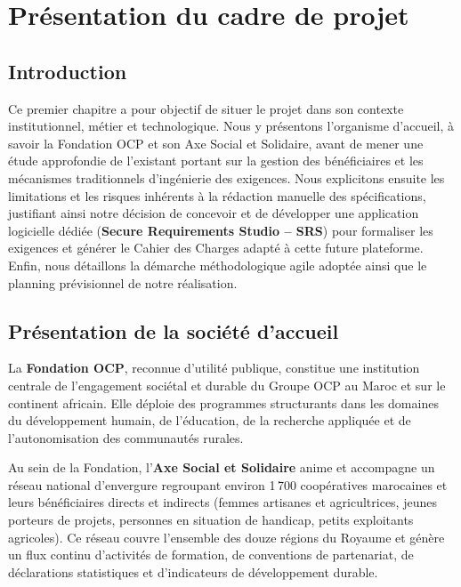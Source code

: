 \chapter{Présentation du cadre de projet}

\section{Introduction}

Ce premier chapitre a pour objectif de situer le projet dans son contexte institutionnel, métier et technologique. Nous y présentons l'organisme d'accueil, à savoir la Fondation OCP et son Axe Social et Solidaire, avant de mener une étude approfondie de l'existant portant sur la gestion des bénéficiaires et les mécanismes traditionnels d'ingénierie des exigences. Nous explicitons ensuite les limitations et les risques inhérents à la rédaction manuelle des spécifications, justifiant ainsi notre décision de concevoir et de développer une application logicielle dédiée (\textbf{Secure Requirements Studio -- SRS}) pour formaliser les exigences et générer le Cahier des Charges adapté à cette future plateforme. Enfin, nous détaillons la démarche méthodologique agile adoptée ainsi que le planning prévisionnel de notre réalisation.

\section{Présentation de la société d'accueil}

La \textbf{Fondation OCP}, reconnue d'utilité publique, constitue une institution centrale de l'engagement sociétal et durable du Groupe OCP au Maroc et sur le continent africain. Elle déploie des programmes structurants dans les domaines du développement humain, de l'éducation, de la recherche appliquée et de l'autonomisation des communautés rurales.

Au sein de la Fondation, l'\textbf{Axe Social et Solidaire} anime et accompagne un réseau national d'envergure regroupant environ 1\,700 coopératives marocaines et leurs bénéficiaires directs et indirects (femmes artisanes et agricultrices, jeunes porteurs de projets, personnes en situation de handicap, petits exploitants agricoles). Ce réseau couvre l'ensemble des douze régions du Royaume et génère un flux continu d'activités de formation, de conventions de partenariat, de déclarations statistiques et d'indicateurs de développement durable.

